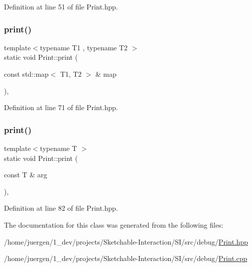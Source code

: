 Definition at line 51 of file Print.\+hpp.

\mbox{\label{class_print_a05c6cdd69d5464717dd309970a137dc9}} 
\subsubsection{\texorpdfstring{print()}{print()}\hspace{0.1cm}{\footnotesize\ttfamily [3/4]}}
{\footnotesize\ttfamily template$<$typename T1 , typename T2 $>$ \\
static void Print\+::print (\begin{DoxyParamCaption}\item[{const std\+::map$<$ T1, T2 $>$ \&}]{map }\end{DoxyParamCaption})\hspace{0.3cm}{\ttfamily [inline]}, {\ttfamily [static]}}



Definition at line 71 of file Print.\+hpp.

\mbox{\label{class_print_ad4e13f34dafb98c6c3591a45c620181a}} 
\subsubsection{\texorpdfstring{print()}{print()}\hspace{0.1cm}{\footnotesize\ttfamily [4/4]}}
{\footnotesize\ttfamily template$<$typename T $>$ \\
static void Print\+::print (\begin{DoxyParamCaption}\item[{const T \&}]{arg }\end{DoxyParamCaption})\hspace{0.3cm}{\ttfamily [inline]}, {\ttfamily [static]}}



Definition at line 82 of file Print.\+hpp.



The documentation for this class was generated from the following files\+:\begin{DoxyCompactItemize}
\item 
/home/juergen/1\+\_\+dev/projects/\+Sketchable-\/\+Interaction/\+S\+I/src/debug/\mbox{\hyperlink{_print_8hpp}{Print.\+hpp}}\item 
/home/juergen/1\+\_\+dev/projects/\+Sketchable-\/\+Interaction/\+S\+I/src/debug/\mbox{\hyperlink{_print_8cpp}{Print.\+cpp}}\end{DoxyCompactItemize}
